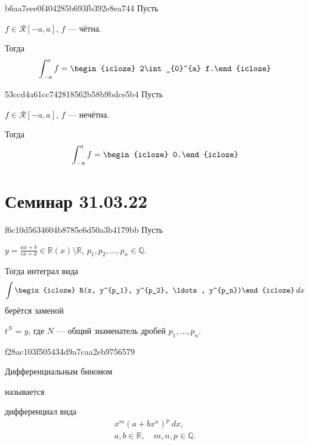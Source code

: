 \begin{note}{b6aa7eee0f404285b693fb392e8ea744}
    Пусть \begin{icloze}{2}\({ f \in \mathcal R[-a, a] }\), \({ f }\) --- чётна.\end{icloze}
    Тогда
    \[
        \begin{gathered}
            \int_{-a}^{a} f = \begin{icloze}{1}2\int_{0}^{a} f.\end{icloze}
        \end{gathered}
    \]
\end{note}

\begin{note}{53ccd4a61cc742818562b58b9bdce5b4}
    Пусть \begin{icloze}{2}\({ f \in \mathcal R[-a, a] }\), \({ f }\) --- нечётна.\end{icloze}
    Тогда
    \[
        \begin{gathered}
            \int_{-a}^{a} f = \begin{icloze}{1}0.\end{icloze}
        \end{gathered}
    \]
\end{note}

\section{Семинар 31.03.22}
\begin{note}{f6c10d5634604b8785e6d50a3b4179bb}
    Пусть \begin{icloze}{3}\({ y = \frac{ax + b}{cx + d} \in \mathbb R(x) \setminus \mathbb R }\),\: \({ p_1, p_2, \ldots, p_n \in \mathbb Q }\).\end{icloze}
    Тогда интеграл вида
    \[
        \int \begin{icloze}{2}R(x, y^{p_1}, y^{p_2}, \ldots, y^{p_n})\end{icloze}\: dx
    \]
    берётся заменой \begin{icloze}{1}\({ t^{N} = y }\), где \({ N }\) --- общий знаменатель дробей \({ p_1, \ldots, p_n }\).\end{icloze}
\end{note}

\begin{note}{f28ac103f505434d9a7caa2eb9756579}
    \begin{icloze}{2}Дифференциальным биномом\end{icloze} называется \begin{icloze}{1}дифференциал вида
    \[
        \begin{gathered}
            x^{m} (a + b x^{n})^{p}\: dx, \\
            a, b \in \mathbb R, \quad m, n, p \in \mathbb Q.
        \end{gathered}
    \]\end{icloze}
\end{note}

